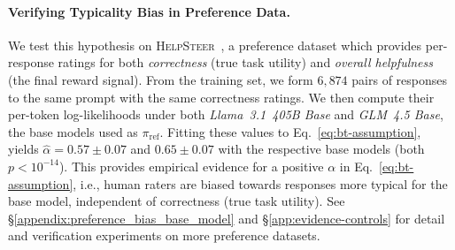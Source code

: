 \paragraph{Verifying Typicality Bias in Preference Data.}  
We test this hypothesis on \textsc{HelpSteer}~\citep{wang2024helpsteer2}, a preference dataset which provides per-response ratings for both \emph{correctness} (true task utility) and \emph{overall helpfulness} (the final reward signal). 
From the training set, we form $6{,}874$ pairs of responses to the same prompt with the same correctness ratings. We then compute their per-token log-likelihoods under both \emph{Llama~3.1~405B Base} and \emph{GLM~4.5 Base}, the base models used as $\pi_{\text{ref}}$. 
Fitting these values to Eq.~\ref{eq:bt-assumption}, yields $\hat{\alpha}=0.57\pm0.07$ and $0.65\pm0.07$ with the respective base models (both $p<10^{-14}$). This provides empirical evidence for a positive $\alpha$ in Eq.~\ref{eq:bt-assumption}, i.e., human raters are biased towards responses more typical for the base model, independent of correctness (true task utility). See \S\ref{appendix:preference_bias_base_model} and \S\ref{app:evidence-controls} for detail and verification experiments on more preference datasets.

